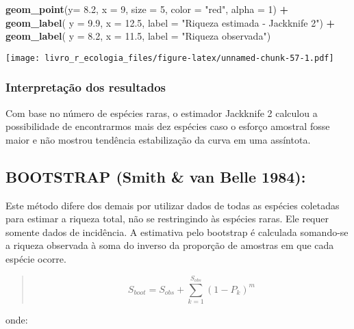 \documentclass[
]{book}
\newenvironment{Shaded}{\begin{snugshade}}{\end{snugshade}}
\newcommand{\DataTypeTok}[1]{\textcolor[rgb]{0.13,0.29,0.53}{#1}}
\newcommand{\DecValTok}[1]{\textcolor[rgb]{0.00,0.00,0.81}{#1}}
\newcommand{\FloatTok}[1]{\textcolor[rgb]{0.00,0.00,0.81}{#1}}
\newcommand{\KeywordTok}[1]{\textcolor[rgb]{0.13,0.29,0.53}{\textbf{#1}}}
\newcommand{\NormalTok}[1]{#1}
\newcommand{\OperatorTok}[1]{\textcolor[rgb]{0.81,0.36,0.00}{\textbf{#1}}}
\newcommand{\StringTok}[1]{\textcolor[rgb]{0.31,0.60,0.02}{#1}}
\begin{document}
\begin{Shaded}
\begin{Highlighting}[]
\StringTok{  }\KeywordTok{geom_point}\NormalTok{(}\DataTypeTok{y=} \FloatTok{8.2}\NormalTok{, }\DataTypeTok{x =} \DecValTok{9}\NormalTok{, }\DataTypeTok{size =} \DecValTok{5}\NormalTok{, }\DataTypeTok{color =} \StringTok{"red"}\NormalTok{, }\DataTypeTok{alpha =} \DecValTok{1}\NormalTok{) }\OperatorTok{+}\StringTok{ }
\StringTok{  }\KeywordTok{geom_label}\NormalTok{( }\DataTypeTok{y =} \FloatTok{9.9}\NormalTok{, }\DataTypeTok{x =} \FloatTok{12.5}\NormalTok{, }\DataTypeTok{label =} \StringTok{"Riqueza estimada - Jackknife 2"}\NormalTok{) }\OperatorTok{+}
\StringTok{  }\KeywordTok{geom_label}\NormalTok{( }\DataTypeTok{y =} \FloatTok{8.2}\NormalTok{, }\DataTypeTok{x =} \FloatTok{11.5}\NormalTok{, }\DataTypeTok{label =} \StringTok{"Riqueza observada"}\NormalTok{)}
\end{Highlighting}
\end{Shaded}

\texttt{[image: livro\_r\_ecologia\_files/figure-latex/unnamed-chunk-57-1.pdf]}

\hypertarget{interpretauxe7uxe3o-dos-resultados-4}{%
\subsubsection{Interpretação dos resultados}\label{interpretauxe7uxe3o-dos-resultados-4}}

Com base no número de espécies raras, o estimador Jackknife 2 calculou a possibilidade de encontrarmos mais dez espécies caso o esforço amostral fosse maior e não mostrou tendência estabilização da curva em uma assíntota.

\hypertarget{bootstrap-smith-van-belle-1984}{%
\subsection{BOOTSTRAP (Smith \& van Belle 1984):}\label{bootstrap-smith-van-belle-1984}}

Este método difere dos demais por utilizar dados de todas as espécies coletadas para estimar a riqueza total, não se restringindo às espécies raras. Ele requer somente dados de incidência. A estimativa pelo bootstrap é calculada somando-se a riqueza observada à soma do inverso da proporção de amostras em que cada espécie ocorre.

\begin{quote}
\[S_{boot} = S_{obs} + \sum_{k=1}^{S_{obs}}(1-P_k)^m\]
\end{quote}

onde:
\end{document}
